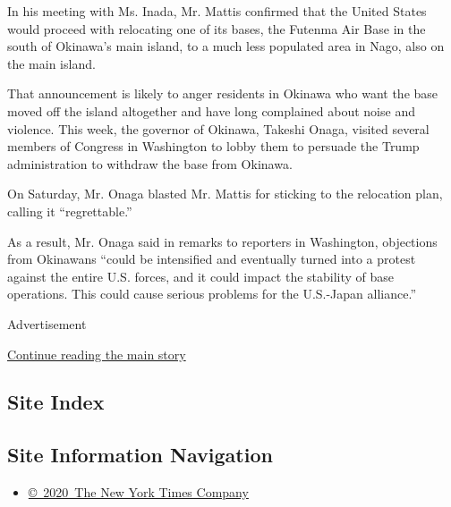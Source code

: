 In his meeting with Ms. Inada, Mr. Mattis confirmed that the United
States would proceed with relocating one of its bases, the Futenma Air
Base in the south of Okinawa's main island, to a much less populated
area in Nago, also on the main island.

That announcement is likely to anger residents in Okinawa who want the
base moved off the island altogether and have long complained about
noise and violence. This week, the governor of Okinawa, Takeshi Onaga,
visited several members of Congress in Washington to lobby them to
persuade the Trump administration to withdraw the base from Okinawa.

On Saturday, Mr. Onaga blasted Mr. Mattis for sticking to the relocation
plan, calling it ``regrettable.''

As a result, Mr. Onaga said in remarks to reporters in Washington,
objections from Okinawans ``could be intensified and eventually turned
into a protest against the entire U.S. forces, and it could impact the
stability of base operations. This could cause serious problems for the
U.S.-Japan alliance.''

Advertisement

\protect\hyperlink{after-bottom}{Continue reading the main story}

\hypertarget{site-index}{%
\subsection{Site Index}\label{site-index}}

\hypertarget{site-information-navigation}{%
\subsection{Site Information
Navigation}\label{site-information-navigation}}

\begin{itemize}
\tightlist
\item
  \href{https://help.nytimes3xbfgragh.onion/hc/en-us/articles/115014792127-Copyright-notice}{©~2020~The
  New York Times Company}
\end{itemize}

